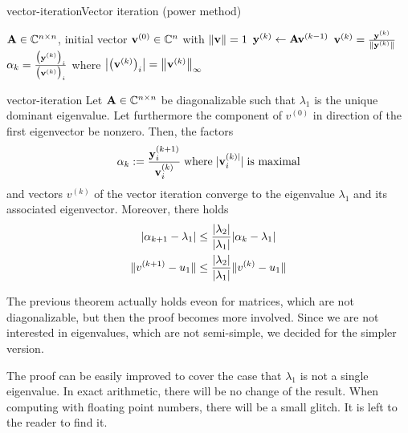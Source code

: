\begin{Algorithm*}{vector-iteration}{Vector iteration (power method)}
  \begin{algorithmic}[1]
    \Require $\mata\in\Cnn$, initial vector $\vv^{(0)}\in\C^n$ with $\norm{\vv}=1$
    \State $\vy^{(k)} \gets \mata \vv^{(k-1)}$
    \State $\vv^{(k)} = \frac{\vy^{(k)}}{\norm{\vy^{(k)}}}$
    \State $\alpha_k = \frac{\bigl(\vy^{(k)}\bigr)_i}{\bigl(\vv^{(k)}\bigr)_i}$ where $\abs*{\bigl(\vv^{(k)}\bigr)_i} = \norm*{\vv^{(k)}}_\infty $
    \EndFor
  \end{algorithmic}
\end{Algorithm*}

\begin{Theorem}{vector-iteration}
  Let $\mata\in\Cnn$ be diagonalizable such that $\lambda_1$ is the
  unique dominant eigenvalue. Let furthermore the
  component of $v^{(0)}$ in direction of the first eigenvector be
  nonzero. Then, the factors
  \[\alpha_k := \frac{\vy^{(k+1)}_i}{\vv_i^{(k)}} \; \text{where} \; |\vv_i^{(k)|}| \; \text{is maximal}\]
  and vectors $v^{(k)}$ of the
  vector iteration converge to the eigenvalue $\lambda_1$ and its
  associated eigenvector. Moreover, there holds
  \begin{align}
    \abs{\alpha_{k+1}-\lambda_1}
    &\le \frac{\abs{\lambda_2}}{\abs{\lambda_1}} \abs{\alpha_{k}-\lambda_1}\\
    \norm{v^{(k+1)}-u_1}
    &\le \frac{\abs{\lambda_2}}{\abs{\lambda_1}} \norm{v^{(k)}-u_1}
  \end{align}
\end{Theorem}

\begin{remark}
  The previous theorem actually holds eveon for matrices, which are
  not diagonalizable, but then the proof becomes more involved. Since
  we are not interested in eigenvalues, which are not semi-simple, we
  decided for the simpler version.

  The proof can be easily improved to cover the case that $\lambda_1$
  is not a single eigenvalue. In exact arithmetic, there will be no
  change of the result. When computing with floating point numbers,
  there will be a small glitch. It is left to the reader to find it.
\end{remark}

